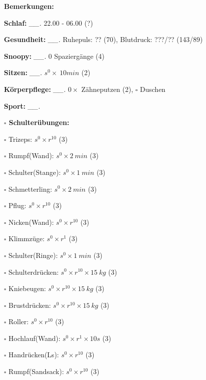 \documentclass[10pt,a4paper]{article}
\newcommand\prop[1] {{\color {alizarin} {\bf #1}}}             %
\newcommand\mand[1] {{\color {burntorange} {\bf #1}}}          %
\newcommand\topspace{\vskip -15pt \hskip 20pt}
\newcommand\n[1] { {\sl #1.} \hskip 5pt }
\begin{document}
\begin{mdframed}[style=daystyle]
  \begin{labeling}{{\mand {Bemerkungen:}}}
    \setlength\itemsep{-3pt}
  \item[{\mand {Schlaf:}}]       \n{\_\_} 22.00 - 06.00 (?)
  \item[{\mand {Gesundheit:}}]   \n{\_\_} Ruhepuls: ?? (70), Blutdruck: ???/?? (143/89)
  \item[{\mand {Snoopy:}}]       \n{\_\_} 0 Spaziergänge (4)
  \item[{\mand {Sitzen:}}]       \n{\_\_} $s^0 \times\ 10 min$ (2)
  \item[{\mand {Körperpflege:}}] \n{\_\_} $0 \times$ Zähneputzen (2), $\square$ Duschen
  \item[{\mand {Sport:}}]        \n{\_\_}
    \topspace
    \begin{minipage}{0.75\textwidth}  
      \begin{labeling}{\prop {$\square$ {Schulterübungen:}}} 
        \setlength\itemsep{-3pt}
      \item[$\square$ Trizeps:]          $s^0 \times r^{10}$ (3)
      \item[$\square$ Rumpf(Wand):]      $s^0 \times 2\ min$ (3)
      \item[$\square$ Schulter(Stange):] $s^0 \times 1\ min$ (3)
      \item[$\square$ Schmetterling:]    $s^0 \times 2\ min$ (3)
      \item[$\square$ Pflug:]            $s^0 \times r^{10}$ (3)
      \item[$\square$ Nicken(Wand):]     $s^0 \times r^{10}$ (3)
      \item[$\square$ Klimmzüge:]        $s^0 \times r^1$ (3)
      \item[$\square$ Schulter(Ringe):]  $s^0 \times 1\ min$ (3)
      \item[$\square$ Schulterdrücken:]  $s^0 \times r^{10} \times 15\ kg$ (3)
      \item[$\square$ Kniebeugen:]       $s^0 \times r^{10} \times 15\ kg$ (3)
      \item[$\square$ Brustdrücken:]     $s^0 \times r^{10} \times 15\ kg$ (3)
      \item[$\square$ Roller:]           $s^0 \times r^{10}$ (3)
      \item[$\square$ Hochlauf(Wand):]   $s^0 \times r^{1} \times 10s$ (3)
      \item[$\square$ Handrücken(Ls):]   $s^0 \times r^{10}$ (3)
      \item[$\square$ Rumpf(Sandsack):]  $s^0 \times r^{10}$ (3)

\end{labeling}
\end{minipage}
\end{labeling}
\end{mdframed}
\end{document}

